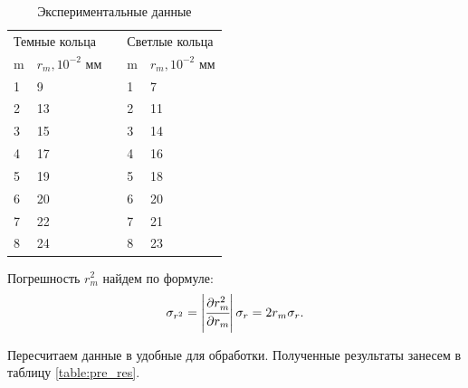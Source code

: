 \documentclass[a4paper,12pt]{article}
\theoremstyle{plain} %
\theoremstyle{definition} %
\theoremstyle{remark} %
\begin{document}
\begin{table}[h!]
	\centering
	\caption{Экспериментальные данные}
	\label{table:expdata}
	\begin{tabular}{lllll}
		\multicolumn{2}{l}{Темные кольца} &  & \multicolumn{2}{l}{Светлые кольца} \\ \cline{1-2} \cline{4-5} 
		\multicolumn{1}{|l|}{m} & \multicolumn{1}{l|}{$r_m, 10^{-2}$ мм} & \multicolumn{1}{l|}{} & \multicolumn{1}{l|}{m} & \multicolumn{1}{l|}{$r_m, 10^{-2}$ мм} \\ \cline{1-2} \cline{4-5} 
		\multicolumn{1}{|l|}{1} & \multicolumn{1}{l|}{9} & \multicolumn{1}{l|}{} & \multicolumn{1}{l|}{1} & \multicolumn{1}{l|}{7} \\ \cline{1-2} \cline{4-5} 
		\multicolumn{1}{|l|}{2} & \multicolumn{1}{l|}{13} & \multicolumn{1}{l|}{} & \multicolumn{1}{l|}{2} & \multicolumn{1}{l|}{11} \\ \cline{1-2} \cline{4-5} 
		\multicolumn{1}{|l|}{3} & \multicolumn{1}{l|}{15} & \multicolumn{1}{l|}{} & \multicolumn{1}{l|}{3} & \multicolumn{1}{l|}{14} \\ \cline{1-2} \cline{4-5} 
		\multicolumn{1}{|l|}{4} & \multicolumn{1}{l|}{17} & \multicolumn{1}{l|}{} & \multicolumn{1}{l|}{4} & \multicolumn{1}{l|}{16} \\ \cline{1-2} \cline{4-5} 
		\multicolumn{1}{|l|}{5} & \multicolumn{1}{l|}{19} & \multicolumn{1}{l|}{} & \multicolumn{1}{l|}{5} & \multicolumn{1}{l|}{18} \\ \cline{1-2} \cline{4-5} 
		\multicolumn{1}{|l|}{6} & \multicolumn{1}{l|}{20} & \multicolumn{1}{l|}{} & \multicolumn{1}{l|}{6} & \multicolumn{1}{l|}{20} \\ \cline{1-2} \cline{4-5} 
		\multicolumn{1}{|l|}{7} & \multicolumn{1}{l|}{22} & \multicolumn{1}{l|}{} & \multicolumn{1}{l|}{7} & \multicolumn{1}{l|}{21} \\ \cline{1-2} \cline{4-5} 
		\multicolumn{1}{|l|}{8} & \multicolumn{1}{l|}{24} & \multicolumn{1}{l|}{} & \multicolumn{1}{l|}{8} & \multicolumn{1}{l|}{23} \\ \cline{1-2} \cline{4-5} 
	\end{tabular}
\end{table}

Погрешность $r^2_m$ найдем по формуле:
\begin{equation}
	\sigma_{r^2} = \left|\cfrac{\partial r^2_m}{\partial r_m}\right|\sigma_r = 2r_m\sigma_r.
\end{equation}

Пересчитаем данные в удобные для обработки. Полученные результаты занесем в таблицу \ref{table:pre_res}.
\end{document}
